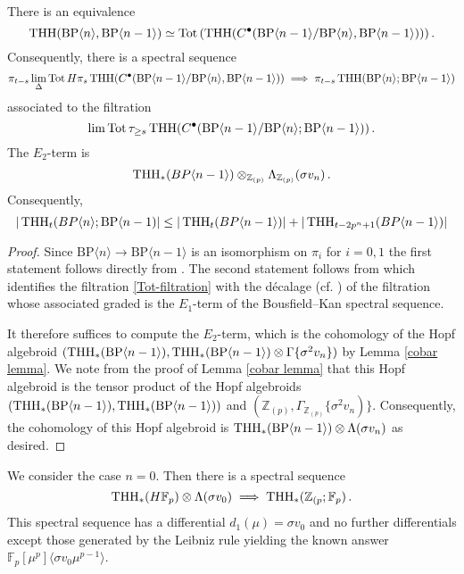 \begin{proposition}\label{induction spectral sequence}
There is an equivalence 
\[ 
	\operatorname{THH}(\mathrm{BP}\langle n \rangle,\mathrm{BP}\langle n-1\rangle)\simeq \operatorname*{Tot} \left ( \operatorname{THH}(C^{\bullet}(\mathrm{BP}\langle n-1\rangle/\mathrm{BP}\langle n\rangle,\mathrm{BP}\langle n-1\rangle)) \right ).
\]
Consequently, there is a spectral sequence 
\[ 
	\pi_{t-s}\lim_{\Delta} \operatorname*{Tot} H\pi_s\operatorname{THH}(C^{\bullet}(\mathrm{BP}\langle n-1\rangle/\mathrm{BP}\langle n\rangle,\mathrm{BP}\langle n-1\rangle))\implies \pi_{t-s}\operatorname{THH}(\mathrm{BP}\langle n\rangle;\mathrm{BP}\langle n-1\rangle)
\]
associated to the filtration 
\begin{equation}\label{Tot-filtration}
	\lim \operatorname*{Tot} \tau_{\ge s}\operatorname{THH}(C^{\bullet}(\mathrm{BP}\langle n-1\rangle/\mathrm{BP}\langle n\rangle ;\mathrm{BP}\langle n-1\rangle))\,.
\end{equation}
The $E_2$-term is
\[ \operatorname{THH}_*(BP\langle n-1\rangle)\otimes_{\mathbb{Z}_{(p)}} \Lambda_{\mathbb{Z}_{(p)}} (\sigma v_n) \,.\]
Consequently,
\[ |\operatorname{THH}_{t}(BP\langle n \rangle;\mathrm{BP}\langle n-1)|\le |\operatorname{THH}_{t}(BP\langle n-1 \rangle)| + |\operatorname{THH}_{t-2p^{n}+1}(BP\langle n-1 \rangle)|\]
\end{proposition}
\begin{proof}
Since $\mathrm{BP}\langle n\rangle\to \mathrm{BP}\langle n-1\rangle$ is an isomorphism on $\pi_i$ for $i=0,1$ the first statement follows directly from \cite[Theorem 3.7]{DR18}. 
The second statement follows from \cite[Remark 3.7]{GIKR22} which identifies the filtration \eqref{Tot-filtration} with the d\'ecalage (cf. \cite[pp. 21]{Del71}) of the filtration whose associated graded is the $E_{1}$-term of the Bousfield--Kan spectral sequence. 

It therefore suffices to compute the $E_{2}$-term, which is the cohomology of the Hopf algebroid $(\operatorname{THH}_{*}(\mathrm{BP}\langle n-1\rangle), \operatorname{THH}_{*}(\mathrm{BP}\langle n-1\rangle)\otimes \Gamma \{ \sigma^{2}v_{n} \} )$ by Lemma \ref{cobar lemma}. 
We note from the proof of Lemma \ref{cobar lemma} that this Hopf algebroid is the tensor product of the Hopf algebroids 
$(\operatorname{THH}_{*}(\mathrm{BP}\langle n-1\rangle), \operatorname{THH}_{*}(\mathrm{BP}\langle n-1\rangle))$ and $(\mathbb{Z}_{(p)},\Gamma_{\mathbb{Z}_{(p)}} \{ \sigma^{2}v_{n})\} $. 
Consequently, the cohomology of this Hopf algebroid is $\operatorname{THH}_{*}(\mathrm{BP}\langle n-1\rangle )\otimes \Lambda (\sigma v_{n})$ as desired. 
\end{proof}

\begin{example}
We consider the case $n=0$. Then there is a spectral sequence 
\[ 
\operatorname{THH}_{*}(H\mathbb{F}_{p})\otimes \Lambda (\sigma v_{0})\implies \operatorname{THH}_{*}(\mathbb{Z}_{(p};\mathbb{F}_{p}) \,.
\]
This spectral sequence has a differential $d_{1}(\mu)=\sigma v_{0}$ and no further differentials except those generated by the Leibniz rule yielding the known answer $\mathbb{F}_p[\mu^p]\langle \sigma v_0 \mu^{p-1}\rangle$. 
\end{example}

